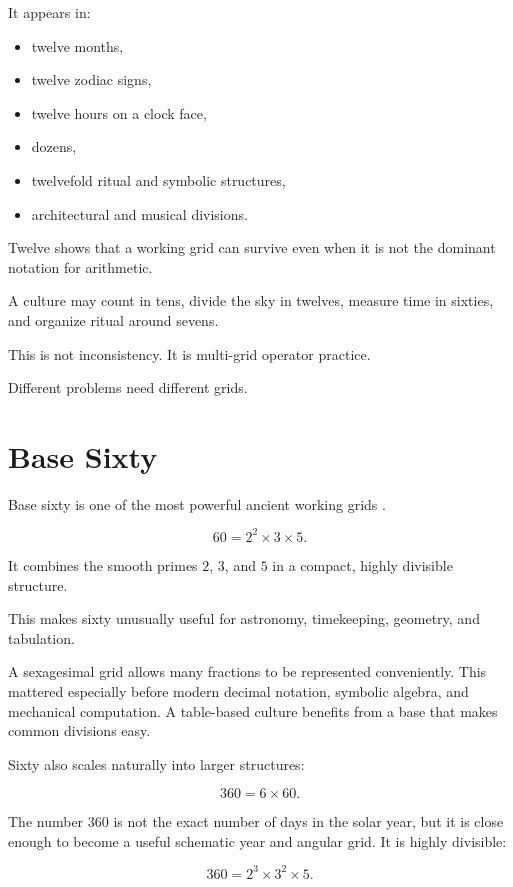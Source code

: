 \documentclass[11pt]{book}
\begin{document}
It appears in:

\begin{itemize}
    \item twelve months,
    \item twelve zodiac signs,
    \item twelve hours on a clock face,
    \item dozens,
    \item twelvefold ritual and symbolic structures,
    \item architectural and musical divisions.
\end{itemize}

Twelve shows that a working grid can survive even when it is not the dominant notation for arithmetic.

A culture may count in tens, divide the sky in twelves, measure time in sixties, and organize ritual around sevens.

This is not inconsistency. It is multi-grid operator practice.

Different problems need different grids.

\section{Base Sixty}

Base sixty is one of the most powerful ancient working grids \cite{Neugebauer1957ExactSciences,Robson2008MathematicsAncientIraq,HungerPingree1999AstralSciences}.

\[
60 = 2^2 \times 3 \times 5.
\]

It combines the smooth primes \(2\), \(3\), and \(5\) in a compact, highly divisible structure.

This makes sixty unusually useful for astronomy, timekeeping, geometry, and tabulation.

A sexagesimal grid allows many fractions to be represented conveniently. This mattered especially before modern decimal notation, symbolic algebra, and mechanical computation. A table-based culture benefits from a base that makes common divisions easy.

Sixty also scales naturally into larger structures:

\[
360 = 6 \times 60.
\]

The number \(360\) is not the exact number of days in the solar year, but it is close enough to become a useful schematic year and angular grid. It is highly divisible:

\[
360 = 2^3 \times 3^2 \times 5.
\]
\end{document}
